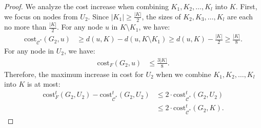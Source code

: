 \documentclass[11pt]{article}
\newcommand{\cost}{\mathrm{cost}}
\begin{document}
\begin{CJK*}{UTF8}{gbsn}
\begin{proof}
We analyze the cost increase when combining $K_1, K_2, \ldots, K_l$ into $K$. First, we focus on nodes from $U_2$. Since $|K_1| \ge \frac{|K|}{2}$, the sizes of $K_2, K_3, \ldots, K_l$ are each no more than $\frac{|K|}{2}$. For any node $u$ in $K \setminus K_1$, we have:
\begin{align*}
    \cost_{\mathcal{C}^*}(G_2, u) &\geq d(u, K) - d(u,K\setminus K_1) \geq d(u, K) - \frac{|K|}{2} \geq \frac{|K|}{8}.
\end{align*}
For any node in $U_2$, we have:
\begin{align*}
    \cost_{F}(G_2, u) &\leq \frac{3|K|}{8}.
\end{align*}
Therefore, the maximum increase in cost for $U_2$ when we combine $K_1, K_2, \ldots, K_l$ into $K$ is at most:
\begin{align*}
    \cost^t_{F}(G_2, U_2) - \cost^t_{\mathcal{C}^*}(G_2, U_2) &\leq 2 \cdot \cost^t_{\mathcal{C}^*}(G_2, U_2) \\
    &\leq 2 \cdot \cost^t_{\mathcal{C}^*}(G_2, K).
\end{align*}


\end{proof}
\end{CJK*}
\end{document}
